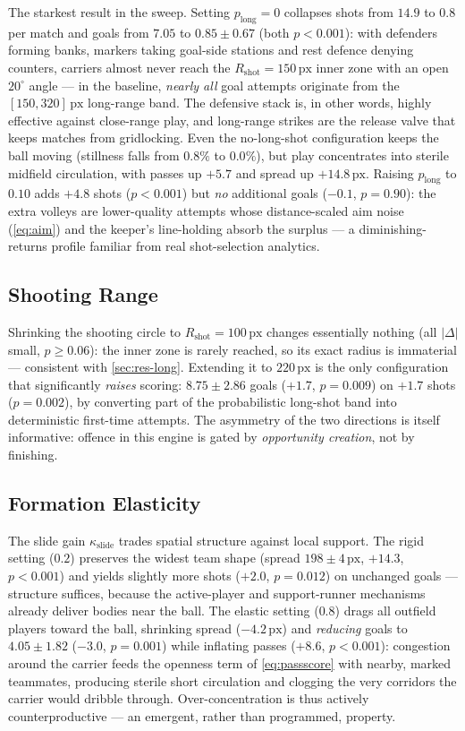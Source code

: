 \documentclass[10pt,twocolumn]{article}
\newcommand{\px}{\ensuremath{\,\mathrm{px}}}
\begin{document}
The starkest result in the sweep. Setting $p_{\text{long}} = 0$ collapses
shots from $14.9$ to $0.8$ per match and goals from $7.05$ to
$0.85 \pm 0.67$ (both $p < 0.001$): with defenders forming banks, markers
taking goal-side stations and rest defence denying counters, carriers
almost never reach the $R_{\text{shot}} = 150\px$ inner zone with an open
$20^{\circ}$ angle --- in the baseline, \emph{nearly all} goal attempts
originate from the $[150, 320]\px$ long-range band. The defensive stack
is, in other words, highly effective against close-range play, and
long-range strikes are the release valve that keeps matches from
gridlocking. Even the no-long-shot configuration keeps the ball moving
(stillness falls from $0.8\%$ to $0.0\%$), but play concentrates into
sterile midfield circulation, with passes up $+5.7$ and spread up
$+14.8\px$. Raising
$p_{\text{long}}$ to $0.10$ adds $+4.8$ shots ($p<0.001$) but
\emph{no} additional goals ($-0.1$, $p=0.90$): the extra volleys are
lower-quality attempts whose distance-scaled aim noise (\cref{eq:aim})
and the keeper's line-holding absorb the surplus --- a diminishing-returns
profile familiar from real shot-selection analytics.

\subsection{Shooting Range}\label{sec:res-range}

Shrinking the shooting circle to $R_{\text{shot}} = 100\px$ changes
essentially nothing (all $|\Delta|$ small, $p \ge 0.06$): the inner zone
is rarely reached, so its exact radius is immaterial --- consistent with
\cref{sec:res-long}. Extending it to $220\px$ is the only configuration
that significantly \emph{raises} scoring: $8.75 \pm 2.86$ goals
($+1.7$, $p=0.009$) on $+1.7$ shots ($p=0.002$), by converting part of
the probabilistic long-shot band into deterministic first-time attempts.
The asymmetry of the two directions is itself informative: offence in this
engine is gated by \emph{opportunity creation}, not by finishing.

\subsection{Formation Elasticity}\label{sec:res-shape}

The slide gain $\kappa_{\text{slide}}$ trades spatial structure against
local support. The rigid setting ($0.2$) preserves the widest team shape
(spread $198 \pm 4\px$, $+14.3$, $p<0.001$) and yields slightly more
shots ($+2.0$, $p=0.012$) on unchanged goals --- structure suffices,
because the active-player and support-runner mechanisms already deliver
bodies near the ball. The elastic setting ($0.8$) drags all outfield
players toward the ball, shrinking spread ($-4.2\px$) and \emph{reducing}
goals to $4.05 \pm 1.82$ ($-3.0$, $p=0.001$) while inflating passes
($+8.6$, $p<0.001$): congestion around the carrier feeds the openness
term of \cref{eq:passscore} with nearby, marked teammates, producing
sterile short circulation and clogging the very corridors the carrier
would dribble through. Over-concentration is thus actively
counterproductive --- an emergent, rather than programmed, property.
\end{document}
